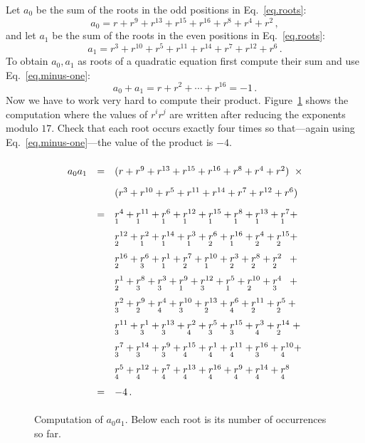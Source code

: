 Let $a_0$ be the sum of the roots in the odd positions in Eq.~\ref{eq.roots}:
\[
a_0=r + r^9 + r^{13} +r^{15} +r^{16} + r^8+r^4+r^2\,,
\]
and let $a_1$ be the sum of the roots in the even positions  in Eq.~\ref{eq.roots}:
\[
a_1=r^3 + r^{10} + r^{5} +r^{11} +r^{14} + r^7+r^{12}+r^6\,.
\]
To obtain $a_0,a_1$ as roots of a quadratic equation first compute their sum and use Eq.~\ref{eq.minus-one}:
\[
a_0+a_1=r + r^2 + \cdots +r^{16}=-1\,.
\]
Now we have to work very hard to compute their product. Figure~\ref{fig.a0a1} shows the computation where the values of $r^ir^j$ are written after reducing the exponents modulo $17$. Check that each root occurs exactly four times so that---again using Eq.~\ref{eq.minus-one}---the value of the product is $-4$.
\begin{figure}[t]
\[
\renewcommand{\arraystretch}{1.8}
\begin{array}{lcl}
a_0a_1&=&(r + r^9 + r^{13} +r^{15} +r^{16} + r^8+r^4+r^2)\;\;\times\\
&&(r^3 + r^{10} + r^{5} +r^{11} +r^{14} + r^7+r^{12}+r^6)\\
&=&\occ{4}{1} + \occ{11}{1} + \occ{6}{1} + \occ{12}{1} + \occ{15}{1} + \occ{8}{1} + \occ{13}{1} + \occ{7}{1} +\\
&&\occ{12}{2} + \occ{2}{1} + \occ{14}{1} + \occ{3}{1} + \occ{6}{2} + \occ{16}{1} + \occ{4}{2} + \occ{15}{2} +\\
&&\occ{16}{2} + \occ{6}{3} + \occ{1}{1} + \occ{7}{2} + \occ{10}{1} + \occ{3}{2} + \occ{8}{2} + \occ{2}{2}\;\;\: +\\
&&\occ{1}{2} + \occ{8}{3} + \occ{3}{3} + \occ{9}{1} + \occ{12}{3} + \occ{5}{1} + \occ{10}{2} + \occ{4}{3}\;\;\: +\\
&&\occ{2}{3} + \occ{9}{2} + \occ{4}{4} + \occ{10}{3} + \occ{13}{2} + \occ{6}{4} + \occ{11}{2} + \occ{5}{2} \:+\\
&&\occ{11}{3} + \occ{1}{3} + \occ{13}{3} + \occ{2}{4} + \occ{5}{3} + \occ{15}{3} + \occ{3}{4} + \occ{14}{2} \;+\\
&&\occ{7}{3} + \occ{14}{3} + \occ{9}{3} + \occ{15}{4} + \occ{1}{4} + \occ{11}{4} + \occ{16}{3} + \occ{10}{4} +\\
&&\occ{5}{4} + \occ{12}{4} + \occ{7}{4} + \occ{13}{4} + \occ{16}{4} + \occ{9}{4} + \occ{14}{4} + \occ{8}{4}\\
&=&-4\,.
\end{array}
\]
\caption{Computation of $a_0a_1$. Below each root is its number of occurrences so far.}\label{fig.a0a1}
\end{figure}


